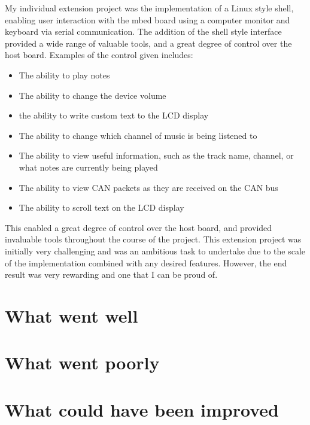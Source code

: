 My individual extension project was the implementation of a Linux style shell, 
enabling user interaction with the mbed board using a computer monitor and 
keyboard via serial communication. The addition of the shell style interface 
provided a wide range of valuable tools, and a great degree of control over the 
host board. Examples of the control given includes: 
\begin{itemize}
    \item The ability to play notes
    \item The ability to change the device volume
    \item the ability to write custom text to the LCD display 
    \item The ability to change which channel of music is being listened to
    \item The ability to view useful information, such as the track name, channel,
or what notes are currently being played
    \item The ability to view CAN packets as they are received on the CAN bus 
    \item The ability to scroll text on the LCD display 
\end{itemize}
This enabled a great degree of control over the host board, and provided 
invaluable tools throughout the course of the project. This extension project 
was initially very challenging and was an ambitious task to undertake due to the 
scale of the implementation combined with any desired features. However, the end 
result was very rewarding and one that I can be proud of. 

\section{What went well}


\section{What went poorly}


\section{What could have been improved}

